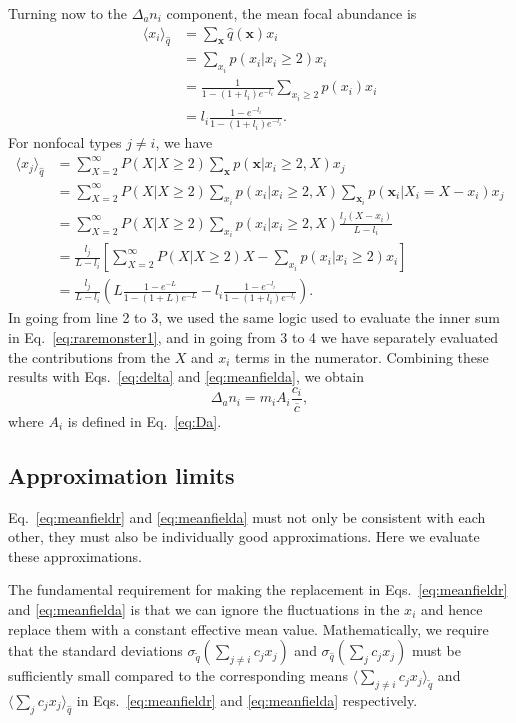 \documentclass[12pt]{article}
\begin{document}
Turning now to the $\Delta_a n_i$ component, the mean focal abundance is 
\begin{align}
\langle x_i \rangle_{\hat{q}}&=\sum_{\mathbf x} \hat{q}({\mathbf x}) x_i\nonumber \\
&=\sum_{x_i} p(x_i|x_i\geq 2)x_i \nonumber\\
&=\frac{1}{1-(1+l_i)e^{-l_i}}\sum_{x_i\geq 2} p(x_i)x_i\nonumber\\
&=l_i\frac{1-e^{-l_i}}{1-(1+l_i)e^{-l_i}}.
\end{align}
For nonfocal types $j\neq i$, we have
\begin{align}
\langle x_j \rangle_{\hat{q}}&=\sum_{X=2}^{\infty}P(X|X\geq 2)\sum_{\mathbf x}  p({\mathbf x}|x_i\geq 2,X) x_j\nonumber\\
&=\sum_{X=2}^{\infty}P(X|X\geq 2)\sum_{x_i} p(x_i|x_i\geq 2,X) \sum_{\mathbf x_i}  p(\mathbf x_i|X_i=X-x_i) x_j\nonumber\\
&=\sum_{X=2}^{\infty}P(X|X\geq 2)\sum_{x_i}p(x_i|x_i\geq 2,X) \frac{l_j(X-x_i)}{L-l_i} \nonumber\\
&=\frac{l_j}{L-l_i}\left[\sum_{X=2}^{\infty}P(X|X\geq 2)X - \sum_{x_i}p(x_i|x_i\geq 2) x_i \right]\nonumber\\
&=\frac{l_j}{L-l_i}\left( L\frac{1-e^{-L}}{1-(1+L)e^{-L}}- l_i\frac{1-e^{-l_i}}{1-(1+l_i)e^{-l_i}}\right).
\end{align}
In going from line 2 to 3, we used the same logic used to evaluate the inner sum in Eq.~\eqref{eq:raremonster1}, and in going from 3 to 4 we have separately evaluated the contributions from the $X$ and $x_i$ terms in the numerator. Combining these results with Eqs.~\eqref{eq:delta} and \eqref{eq:meanfielda}, we obtain
\begin{equation}
\Delta_a n_i=m_i A_i \frac{c_i}{\overline{c}},
\end{equation}
where $A_i$ is defined in Eq.~\eqref{eq:Da}.

\subsection*{Approximation limits}

Eq.~\eqref{eq:meanfieldr} and \eqref{eq:meanfielda} must not only be consistent with each other, they must also be individually good approximations. Here we evaluate these approximations.

The fundamental requirement for making the replacement in Eqs.~\eqref{eq:meanfieldr} and \eqref{eq:meanfielda} is that we can ignore the fluctuations in the $x_i$ and hence replace them with a constant effective mean value. Mathematically, we require that the standard deviations $\sigma_{\tilde{q}}(\sum_{j\neq i} c_j x_j)$ and $\sigma_{\hat{q}}(\sum_j c_j x_j)$ must be sufficiently small compared to the corresponding means $\langle\sum_{j\neq i} c_j x_j\rangle_{\tilde{q}}$ and $\langle\sum_j c_j x_j\rangle_{\hat{q}}$ in Eqs.~\eqref{eq:meanfieldr} and \eqref{eq:meanfielda} respectively.  
\end{document}
